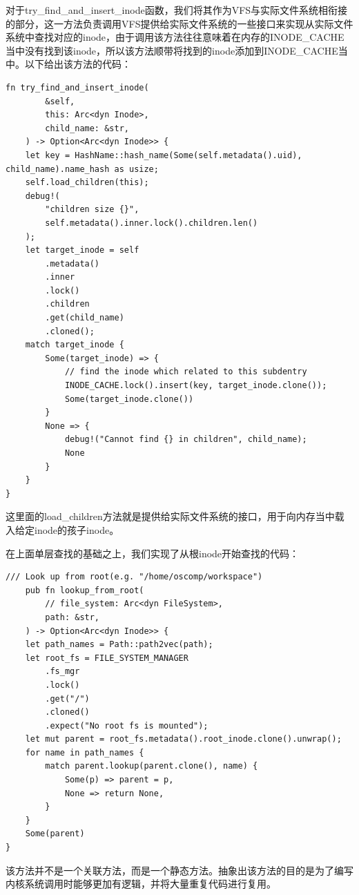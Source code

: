对于try\_find\_and\_insert\_inode函数，我们将其作为VFS与实际文件系统相衔接的部分，这一方法负责调用VFS提供给实际文件系统的一些接口来实现从实际文件系统中查找对应的inode，由于调用该方法往往意味着在内存的INODE\_CACHE当中没有找到该inode，所以该方法顺带将找到的inode添加到INODE\_CACHE当中。以下给出该方法的代码：
\begin{tcolorbox}[
title=\textbf{os/src/fs/inode.rs},
listing only,
breakable
]
\begin{verbatim}
fn try_find_and_insert_inode(
        &self,
        this: Arc<dyn Inode>,
        child_name: &str,
    ) -> Option<Arc<dyn Inode>> {
    let key = HashName::hash_name(Some(self.metadata().uid), child_name).name_hash as usize;
    self.load_children(this);
    debug!(
        "children size {}",
        self.metadata().inner.lock().children.len()
    );
    let target_inode = self
        .metadata()
        .inner
        .lock()
        .children
        .get(child_name)
        .cloned();
    match target_inode {
        Some(target_inode) => {
            // find the inode which related to this subdentry
            INODE_CACHE.lock().insert(key, target_inode.clone());
            Some(target_inode.clone())
        }
        None => {
            debug!("Cannot find {} in children", child_name);
            None
        }
    }
}
\end{verbatim}
\end{tcolorbox}
这里面的load\_children方法就是提供给实际文件系统的接口，用于向内存当中载入给定inode的孩子inode。

在上面单层查找的基础之上，我们实现了从根inode开始查找的代码：
\begin{tcolorbox}[
title=\textbf{os/src/fs/inode.rs},
listing only,
breakable
]
\begin{verbatim}
/// Look up from root(e.g. "/home/oscomp/workspace")
    pub fn lookup_from_root(
        // file_system: Arc<dyn FileSystem>,
        path: &str,
    ) -> Option<Arc<dyn Inode>> {
    let path_names = Path::path2vec(path);
    let root_fs = FILE_SYSTEM_MANAGER
        .fs_mgr
        .lock()
        .get("/")
        .cloned()
        .expect("No root fs is mounted");
    let mut parent = root_fs.metadata().root_inode.clone().unwrap();
    for name in path_names {
        match parent.lookup(parent.clone(), name) {
            Some(p) => parent = p,
            None => return None,
        }
    }
    Some(parent)
}
\end{verbatim}
\end{tcolorbox}
该方法并不是一个关联方法，而是一个静态方法。抽象出该方法的目的是为了编写内核系统调用时能够更加有逻辑，并将大量重复代码进行复用。

